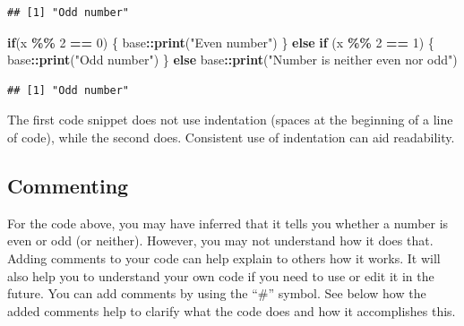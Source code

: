 \documentclass[
]{book}
\newenvironment{Shaded}{\begin{snugshade}}{\end{snugshade}}
\newcommand{\ControlFlowTok}[1]{\textcolor[rgb]{0.13,0.29,0.53}{\textbf{#1}}}
\newcommand{\DecValTok}[1]{\textcolor[rgb]{0.00,0.00,0.81}{#1}}
\newcommand{\FunctionTok}[1]{\textcolor[rgb]{0.13,0.29,0.53}{\textbf{#1}}}
\newcommand{\NormalTok}[1]{#1}
\newcommand{\SpecialCharTok}[1]{\textcolor[rgb]{0.81,0.36,0.00}{\textbf{#1}}}
\newcommand{\StringTok}[1]{\textcolor[rgb]{0.31,0.60,0.02}{#1}}
\begin{document}
\begin{verbatim}
## [1] "Odd number"
\end{verbatim}

\begin{Shaded}
\begin{Highlighting}[]
\ControlFlowTok{if}\NormalTok{(x }\SpecialCharTok{\%\%} \DecValTok{2} \SpecialCharTok{==} \DecValTok{0}\NormalTok{) \{}
\NormalTok{  base}\SpecialCharTok{::}\FunctionTok{print}\NormalTok{(}\StringTok{"Even number"}\NormalTok{)}
\NormalTok{\} }\ControlFlowTok{else} \ControlFlowTok{if}\NormalTok{ (x }\SpecialCharTok{\%\%} \DecValTok{2} \SpecialCharTok{==} \DecValTok{1}\NormalTok{) \{}
\NormalTok{  base}\SpecialCharTok{::}\FunctionTok{print}\NormalTok{(}\StringTok{"Odd number"}\NormalTok{)}
\NormalTok{\} }\ControlFlowTok{else}
\NormalTok{  base}\SpecialCharTok{::}\FunctionTok{print}\NormalTok{(}\StringTok{"Number is neither even nor odd"}\NormalTok{)}
\end{Highlighting}
\end{Shaded}

\begin{verbatim}
## [1] "Odd number"
\end{verbatim}

The first code snippet does not use indentation (spaces at the beginning of a line of code), while the second does. Consistent use of indentation can aid readability.

\subsection{Commenting}\label{commenting}

For the code above, you may have inferred that it tells you whether a number is even or odd (or neither). However, you may not understand how it does that. Adding comments to your code can help explain to others how it works. It will also help you to understand your own code if you need to use or edit it in the future. You can add comments by using the ``\#'' symbol. See below how the added comments help to clarify what the code does and how it accomplishes this.
\end{document}
